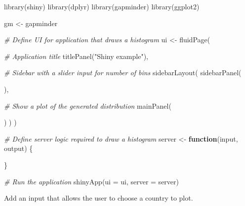 \documentclass[
]{book}
\newenvironment{Shaded}{\begin{snugshade}}{\end{snugshade}}
\newcommand{\AttributeTok}[1]{\textcolor[rgb]{0.77,0.63,0.00}{#1}}
\newcommand{\CommentTok}[1]{\textcolor[rgb]{0.56,0.35,0.01}{\textit{#1}}}
\newcommand{\ControlFlowTok}[1]{\textcolor[rgb]{0.13,0.29,0.53}{\textbf{#1}}}
\newcommand{\FunctionTok}[1]{\textcolor[rgb]{0.00,0.00,0.00}{#1}}
\newcommand{\NormalTok}[1]{#1}
\newcommand{\OtherTok}[1]{\textcolor[rgb]{0.56,0.35,0.01}{#1}}
\newcommand{\StringTok}[1]{\textcolor[rgb]{0.31,0.60,0.02}{#1}}
\begin{document}
\begin{Shaded}
\begin{Highlighting}[]

\FunctionTok{library}\NormalTok{(shiny)}
\FunctionTok{library}\NormalTok{(dplyr)}
\FunctionTok{library}\NormalTok{(gapminder)}
\FunctionTok{library}\NormalTok{(ggplot2)}

\NormalTok{gm }\OtherTok{\textless{}{-}}\NormalTok{ gapminder}

\CommentTok{\# Define UI for application that draws a histogram}
\NormalTok{ui }\OtherTok{\textless{}{-}} \FunctionTok{fluidPage}\NormalTok{(}

    \CommentTok{\# Application title}
    \FunctionTok{titlePanel}\NormalTok{(}\StringTok{"Shiny example"}\NormalTok{),}

    \CommentTok{\# Sidebar with a slider input for number of bins }
    \FunctionTok{sidebarLayout}\NormalTok{(}
        \FunctionTok{sidebarPanel}\NormalTok{(}
            
\NormalTok{        ),}

        \CommentTok{\# Show a plot of the generated distribution}
        \FunctionTok{mainPanel}\NormalTok{(}
          
\NormalTok{        )}
\NormalTok{    )}
\NormalTok{)}

\CommentTok{\# Define server logic required to draw a histogram}
\NormalTok{server }\OtherTok{\textless{}{-}} \ControlFlowTok{function}\NormalTok{(input, output) \{}

\NormalTok{\}}

\CommentTok{\# Run the application }
\FunctionTok{shinyApp}\NormalTok{(}\AttributeTok{ui =}\NormalTok{ ui, }\AttributeTok{server =}\NormalTok{ server)}
\end{Highlighting}
\end{Shaded}

Add an input that allows the user to choose a country to plot.
\end{document}
